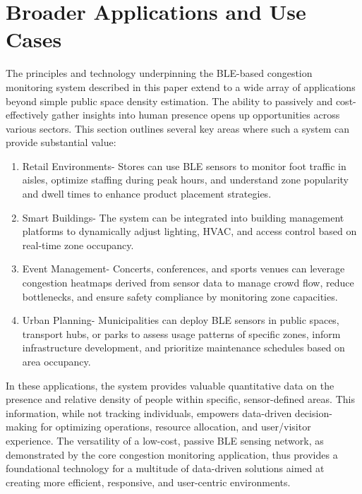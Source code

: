 \documentclass[runningheads]{llncs}
\begin{document}
\section{Broader Applications and Use Cases}
The principles and technology underpinning the BLE-based congestion monitoring system described in this paper extend to a wide array of applications beyond simple public space density estimation. The ability to passively and cost-effectively gather insights into human presence opens up opportunities across various sectors. This section outlines several key areas where such a system can provide substantial value:
\begin{enumerate}
    \item  Retail Environments-
    Stores can use BLE sensors to monitor foot traffic in aisles, optimize staffing during peak hours, and understand zone popularity and dwell times to enhance product placement strategies.

    \item  Smart Buildings-
    The system can be integrated into building management platforms to dynamically adjust lighting, HVAC, and access control based on real-time zone occupancy\cite{AlFuqaha_IoT}.

    \item  Event Management-
    Concerts, conferences, and sports venues can leverage congestion heatmaps derived from sensor data to manage crowd flow, reduce bottlenecks, and ensure safety compliance by monitoring zone capacities.

    \item  Urban Planning-
    Municipalities can deploy BLE sensors in public spaces, transport hubs, or parks to assess usage patterns of specific zones, inform infrastructure development, and prioritize maintenance schedules based on area occupancy.
\end{enumerate}


In these applications, the system provides valuable quantitative data on the presence and relative density of people within specific, sensor-defined areas. This information, while not tracking individuals, empowers data-driven decision-making for optimizing operations, resource allocation, and user/visitor experience.
The versatility of a low-cost, passive BLE sensing network, as demonstrated by the core congestion monitoring application, thus provides a foundational technology for a multitude of data-driven solutions aimed at creating more efficient, responsive, and user-centric environments.
\end{document}
